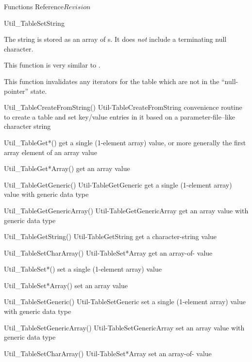 \begin{cactuspart}{ Functions Reference}{}{$Revision$}
\begin{FunctionDescription}{Util\_TableSetString}
\begin{Discussion}
The string is stored as an array of 
s.  It does {\em not\/} include a terminating
null character.

This function is very similar to .

This function invalidates any iterators for the table which are
not in the ``null-pointer'' state.
\end{Discussion}

\begin{SeeAlsoSection}
\begin{SeeAlso2} {Util\_TableCreateFromString()} {Util-TableCreateFromString}
convenience routine to create a table and set key/value entries
in it based on a parameter-file--like character string
\end{SeeAlso2}
\begin{SeeAlso}{Util\_TableGet*()}
get a single (1-element array) value,
or more generally the first array element of an array value
\end{SeeAlso}
\begin{SeeAlso}{Util\_TableGet*Array()}
get an array value
\end{SeeAlso}
\begin{SeeAlso2} {Util\_TableGetGeneric()} {Util-TableGetGeneric}
get a single (1-element array) value with generic data type
\end{SeeAlso2}
\begin{SeeAlso2} {Util\_TableGetGenericArray()} {Util-TableGetGenericArray}
get an array value with generic data type
\end{SeeAlso2}
\begin{SeeAlso2} {Util\_TableGetString()} {Util-TableGetString}
get a character-string value
\end{SeeAlso2}
\begin{SeeAlso2} {Util\_TableSetCharArray()} {Util-TableSet*Array}
get an array-of- value
\end{SeeAlso2}
\begin{SeeAlso}{Util\_TableSet*()}
set a single (1-element array) value
\end{SeeAlso}
\begin{SeeAlso}{Util\_TableSet*Array()}
set an array value
\end{SeeAlso}
\begin{SeeAlso2} {Util\_TableSetGeneric()} {Util-TableSetGeneric}
set a single (1-element array) value with generic data type
\end{SeeAlso2}
\begin{SeeAlso2} {Util\_TableSetGenericArray()} {Util-TableSetGenericArray}
set an array value with generic data type
\end{SeeAlso2}
\begin{SeeAlso2} {Util\_TableSetCharArray()} {Util-TableSet*Array}
set an array-of- value
\end{SeeAlso2}
\end{SeeAlsoSection}


\end{FunctionDescription}
\end{cactuspart}
